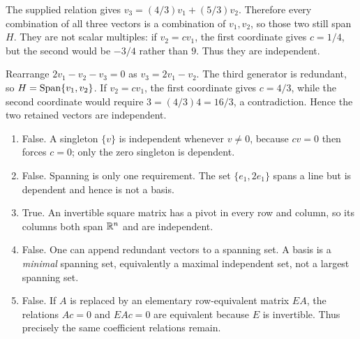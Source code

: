 The supplied relation gives $v_3=(4/3)v_1+(5/3)v_2$.
Therefore every combination of all three vectors is a combination of
$v_1,v_2$, so those two still span $H$. They are not scalar multiples:
if $v_2=cv_1$, the first coordinate gives $c=1/4$, but the second
would be $-3/4$ rather than $9$. Thus they are independent.

Rearrange $2v_1-v_2-v_3=0$ as $v_3=2v_1-v_2$.
The third generator is redundant, so $H=\operatorname{Span}\{v_1,v_2\}$.
If $v_2=cv_1$, the first coordinate gives $c=4/3$, while the
second coordinate would require $3=(4/3)4=16/3$, a contradiction.
Hence the two retained vectors are independent.

\begin{enumerate}[label=(\alph*)]
\item False. A singleton $\{v\}$ is independent whenever $v\ne0$,
because $cv=0$ then forces $c=0$; only the zero singleton is dependent.
\item False. Spanning is only one requirement. The set $\{e_1,2e_1\}$
spans a line but is dependent and hence is not a basis.
\item True. An invertible square matrix has a pivot in every row and
column, so its columns both span $\mathbb{R}^n$ and are independent.
\item False. One can append redundant vectors to a spanning set.
A basis is a \emph{minimal} spanning set, equivalently a maximal
independent set, not a largest spanning set.
\item False. If $A$ is replaced by an elementary row-equivalent matrix
$EA$, the relations $Ac=0$ and $EAc=0$ are equivalent because $E$ is
invertible. Thus precisely the same coefficient relations remain.
\end{enumerate}

